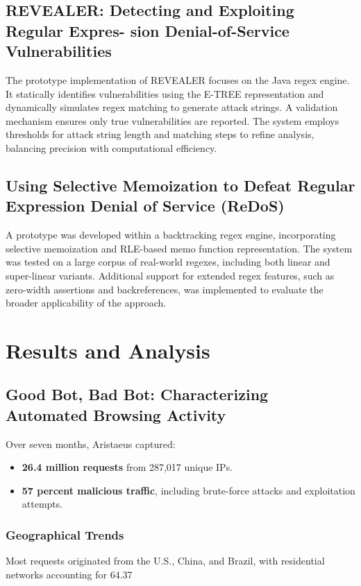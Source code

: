 \documentclass[conference]{IEEEtran}
\begin{document}
\subsection{\textbf{REVEALER: Detecting and Exploiting Regular Expres-
sion Denial-of-Service Vulnerabilities}}
The prototype implementation of REVEALER focuses on the Java regex engine. It statically identifies vulnerabilities using the E-TREE representation and dynamically simulates regex matching to generate attack strings. A validation mechanism ensures only true vulnerabilities are reported. The system employs thresholds for attack string length and matching steps to refine analysis, balancing precision with computational efficiency.

\subsection{\textbf{Using Selective Memoization to Defeat Regular Expression Denial of Service (ReDoS)}}
A prototype was developed within a backtracking regex engine, incorporating selective memoization and RLE-based memo function representation. The system was tested on a large corpus of real-world regexes, including both linear and super-linear variants. Additional support for extended regex features, such as zero-width assertions and backreferences, was implemented to evaluate the broader applicability of the approach.

\section{Results and Analysis}
\subsection{\textbf{Good Bot, Bad Bot: Characterizing Automated Browsing Activity}}
Over seven months, Aristaeus captured:
\begin {itemize}
\item \textbf{26.4 million requests} from 287,017 unique IPs.
\item \textbf{57 percent malicious traffic}, including brute-force attacks and exploitation attempts.
\end {itemize}

\subsubsection{Geographical Trends}
Most requests originated from the U.S., China, and Brazil, with residential networks accounting for 64.37%
\end{document}
